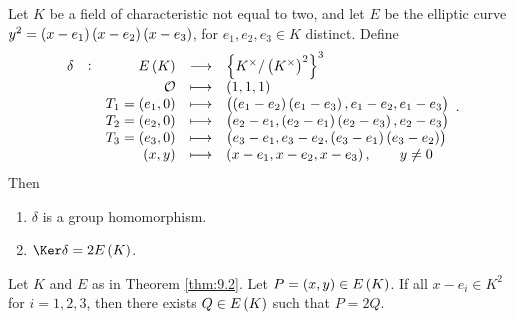 
\begin{theorem}
\label{thm:9.2}
Let $ K $ be a field of characteristic not equal to two, and let $ E $ be the elliptic curve $ y^2 = \br{x - e_1}\br{x - e_2}\br{x - e_3} $, for $ e_1, e_2, e_3 \in K $ distinct. Define
$$
\begin{array}{ccrcl}
\delta & : & E\br{K} & \longrightarrow & \cbr{K^\times / \br{K^\times}^2}^3 \\
& & \OOO & \longmapsto & \br{1, 1, 1} \\
& & T_1 = \br{e_1, 0} & \longmapsto & \br{\br{e_1 - e_2}\br{e_1 - e_3}, e_1 - e_2, e_1 - e_3} \\
& & T_2 = \br{e_2, 0} & \longmapsto & \br{e_2 - e_1, \br{e_2 - e_1}\br{e_2 - e_3}, e_2 - e_3} \\
& & T_3 = \br{e_3, 0} & \longmapsto & \br{e_3 - e_1, e_3 - e_2, \br{e_3 - e_1}\br{e_3 - e_2}} \\
& & \br{x, y} & \longmapsto & \br{x - e_1, x - e_2, x - e_3}, \qquad y \ne 0
\end{array}.
$$
Then
\begin{enumerate}
\item $ \delta $ is a group homomorphism.
\item $ \Ker \delta = 2E\br{K} $.
\end{enumerate}
\end{theorem}

\begin{lemma}
\label{lem:9.3}
Let $ K $ and $ E $ as in Theorem \ref{thm:9.2}. Let $ P = \br{x, y} \in E\br{K} $. If all $ x - e_i \in K^2 $ for $ i = 1, 2, 3 $, then there exists $ Q \in E\br{K} $ such that $ P = 2Q $.
\end{lemma}

